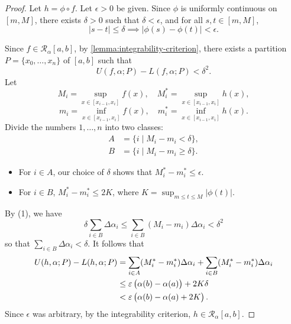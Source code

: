 \begin{proof}
Let $h=\phi\circ f$. Let $\epsilon>0$ be given. Since $\phi$ is uniformly continuous on $[m,M]$, there exists $\delta>0$ such that $\delta<\epsilon$, and for all $s,t\in[m,M]$,
\[|s-t|\le\delta\implies|\phi(s)-\phi(t)|<\epsilon.\]

Since $f\in \mathcal{R}_\alpha[a,b]$, by \cref{lemma:integrability-criterion}, there exists a partition $P=\{x_0,\dots,x_n\}$ of $[a,b]$ such that
\begin{equation*}\tag{1}
U(f,\alpha;P)-L(f,\alpha;P)<\delta^2.
\end{equation*}
Let 
\[M_i=\sup_{x\in[x_{i-1},x_i]}f(x),\quad M_i^*=\sup_{x\in[x_{i-1},x_i]}h(x),\]
\[m_i=\inf_{x\in[x_{i-1},x_i]}f(x),\quad m_i^*=\inf_{x\in[x_{i-1},x_i]}h(x).\]
Divide the numbers $1,\dots,n$ into two classes:
\begin{align*}
A&=\{i\mid M_i-m_i<\delta\},\\
B&=\{i\mid M_i-m_i\ge\delta\}.
\end{align*}
\begin{itemize}
\item For $i\in A$, our choice of $\delta$ shows that $M_i^*-m_i^*\le\epsilon$.
\item For $i\in B$, $M_i^*-m_i^*\le 2K$, where $\displaystyle K=\sup_{m\le t\le M}|\phi(t)|$.
\end{itemize}
By (1), we have
\[\delta\sum_{i\in B}\Delta\alpha_i\le\sum_{i\in B}(M_i-m_i)\Delta\alpha_i<\delta^2\]
so that $\sum_{i\in B}\Delta\alpha_i<\delta$. It follows that
\begin{align*}
U(h,\alpha;P)-L(h,\alpha;P)
&=\sum_{i\in A}(M_i^*-m_i^*)\Delta\alpha_i+\sum_{i\in B}(M_i^*-m_i^*)\Delta\alpha_i\\
&\le\varepsilon\left(\alpha(b)-\alpha(a)\right)+2K\delta\\
&<\varepsilon\left(\alpha(b)-\alpha(a)+2K\right).
\end{align*}
Since $\epsilon$ was arbitrary, by the integrability criterion, $h\in\mathcal{R}_\alpha[a,b]$.
\end{proof}
\pagebreak

